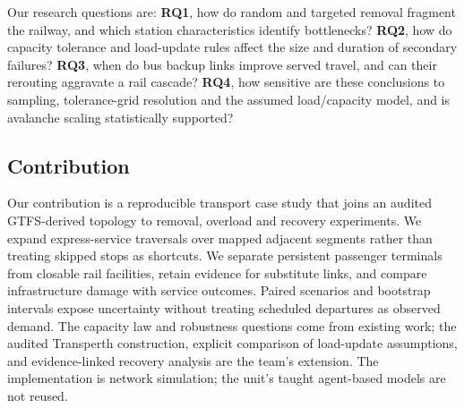 Our research questions are: \textbf{RQ1}, how do random and targeted removal
fragment the railway, and which station characteristics identify bottlenecks?
\textbf{RQ2}, how do capacity tolerance and load-update rules affect the size
and duration of secondary failures? \textbf{RQ3}, when do bus backup links
improve served travel, and can their rerouting aggravate a rail cascade?
\textbf{RQ4}, how sensitive are these conclusions to sampling, tolerance-grid
resolution and the assumed load/capacity model, and is avalanche scaling
statistically supported?

\subsection{Contribution}
Our contribution is a reproducible transport case study that joins an audited
GTFS-derived topology to removal, overload and recovery experiments. We expand
express-service traversals over mapped adjacent segments rather than treating
skipped stops as shortcuts. We separate persistent passenger terminals from
closable rail facilities, retain evidence for substitute links, and compare
infrastructure damage with service outcomes. Paired scenarios and bootstrap
intervals expose uncertainty without treating scheduled departures as observed
demand. The capacity law and robustness questions come from existing work;
the audited Transperth construction, explicit comparison of load-update
assumptions, and evidence-linked recovery analysis are the team's extension.
The implementation is network simulation; the unit's taught agent-based models
are not reused.

